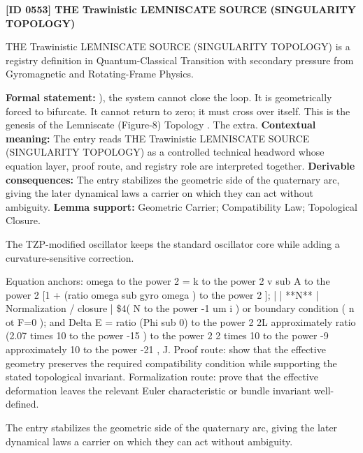 \clearpage
\noindent\textbf{[ID 0553] THE Trawinistic LEMNISCATE SOURCE (SINGULARITY TOPOLOGY)}\par
\vspace{0.35em}
\begingroup\small
{}
THE Trawinistic LEMNISCATE SOURCE (SINGULARITY TOPOLOGY) is a registry definition in Quantum-Classical Transition with secondary pressure from Gyromagnetic and Rotating-Frame Physics.

\begingroup\footnotesize\setlength{\emergencystretch}{3em}\sloppy
\textbf{Formal statement:} ), the system cannot close the loop. It is geometrically forced to bifurcate. It cannot return to zero; it must cross over itself. This is the genesis of the Lemniscate (Figure-8) Topology . The extra. \textbf{Contextual meaning:} The entry reads THE Trawinistic LEMNISCATE SOURCE (SINGULARITY TOPOLOGY) as a controlled technical headword whose equation layer, proof route, and registry role are interpreted together. \textbf{Derivable consequences:} The entry stabilizes the geometric side of the quaternary arc, giving the later dynamical laws a carrier on which they can act without ambiguity. \textbf{Lemma support:} Geometric Carrier; Compatibility Law; Topological Closure.\par
\endgroup

The TZP-modified oscillator keeps the standard oscillator core while adding a curvature-sensitive correction.

Equation anchors: omega to the power 2 = k to the power 2 v sub A to the power 2 [1 + (ratio omega sub gyro omega ) to the power 2 ]; | | **N** | Normalization / closure | \$4( N to the power -1 um i ) or boundary condition ( n ot F=0 ); and Delta E = ratio (Phi sub 0) to the power 2 2L approximately ratio (2.07 times 10 to the power -15 ) to the power 2 2 times 10 to the power -9 approximately 10 to the power -21 , J. Proof route: show that the effective geometry preserves the required compatibility condition while supporting the stated topological invariant. Formalization route: prove that the effective deformation leaves the relevant Euler characteristic or bundle invariant well-defined.

The entry stabilizes the geometric side of the quaternary arc, giving the later dynamical laws a carrier on which they can act without ambiguity.
\endgroup

